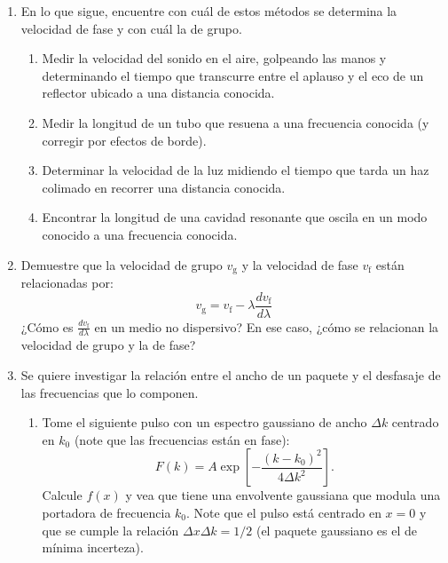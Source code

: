 \documentclass[11pt,spanish]{article}
\begin{document}
\begin{enumerate}



    \item En lo que sigue, encuentre con cuál de estos métodos se determina
    la velocidad de fase y con cuál la de grupo.

    \begin{enumerate}
        \item Medir la velocidad del sonido en el aire, golpeando las manos y
        determinando el tiempo que transcurre entre el aplauso y el eco de un
        reflector ubicado a una distancia conocida.

        \item Medir la longitud de un tubo que resuena a una frecuencia conocida
        (y corregir por efectos de borde).

        \item Determinar la velocidad de la luz midiendo el tiempo que tarda un
        haz colimado en recorrer una distancia conocida.

        \item Encontrar la longitud de una cavidad resonante que oscila en un
        modo conocido a una frecuencia conocida.
    \end{enumerate}


    \item Demuestre que la velocidad de grupo $v_\text{g}$ y la velocidad de fase
    $v_\text{f}$ están relacionadas por:
    \[
    v_\text{g}=v_\text{f}-\lambda\frac{dv_\text{f}}{d\lambda}
    \]
    ¿Cómo es $\frac{dv_\text{f}}{d\lambda}$ en un medio no dispersivo? En
    ese caso, ¿cómo se relacionan la velocidad de grupo y la de fase?


    \item Se quiere investigar la relación entre el ancho de un paquete y el
    desfasaje de las frecuencias que lo componen.

    \begin{enumerate}

        \item Tome el siguiente pulso con un espectro gaussiano de ancho $\Delta k$
        centrado en $k_{0}$ (note que las frecuencias están en fase):
        \[
        F(k)=A\exp\left[-\frac{(k-k_{0})^{2}}{4\Delta k^{2}}\right].
        \]
        Calcule $f(x)$ y vea que tiene una envolvente gaussiana que modula
        una portadora de frecuencia $k_{0}$. Note que el pulso está centrado
        en $x=0$ y que se cumple la relación $\Delta x\Delta k=1/2$ (el
        paquete gaussiano es el de mínima incerteza).


\end{enumerate}
\end{enumerate}
\end{document}
